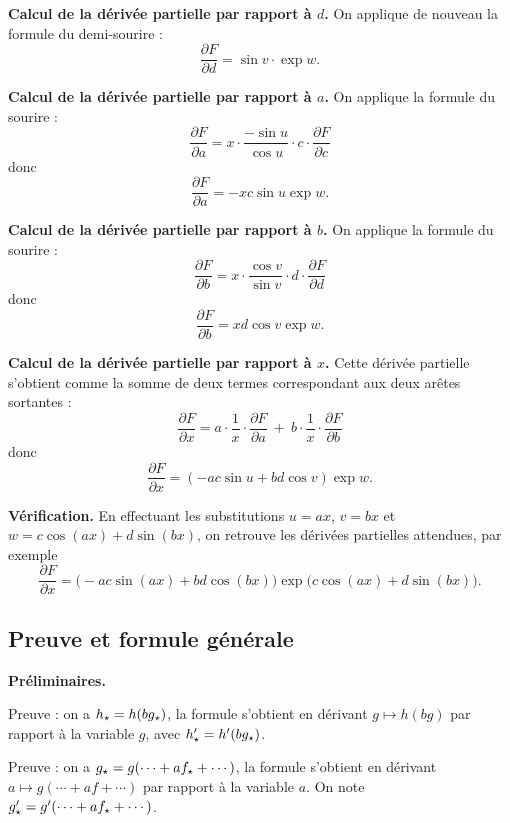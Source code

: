{\textbf{Calcul de la dérivée partielle par rapport à $d$.}
On applique de nouveau la formule du demi-sourire :
$$\frac{\partial F}{\partial d} = \sin v \cdot \exp w.$$

\textbf{Calcul de la dérivée partielle par rapport à $a$.}
On applique la formule du sourire :
$$\frac{\partial F}{\partial a} = x \cdot \frac{-\sin u}{\cos u} \cdot c \cdot  \frac{\partial F}{\partial c}$$
donc 
$$\frac{\partial F}{\partial a} = -x c \sin u \exp w.$$

\textbf{Calcul de la dérivée partielle par rapport à $b$.}
On applique la formule du sourire :
$$\frac{\partial F}{\partial b} = x \cdot \frac{\cos v}{\sin v} \cdot d \cdot  \frac{\partial F}{\partial d}$$
donc 
$$\frac{\partial F}{\partial b} = x d \cos v \exp w.$$

\textbf{Calcul de la dérivée partielle par rapport à $x$.}
Cette dérivée partielle s'obtient comme la somme de deux termes correspondant aux deux arêtes sortantes :
$$\frac{\partial F}{\partial x} = a \cdot \frac{1}{x} \cdot \frac{\partial F}{\partial a} \ + \  b \cdot \frac{1}{x} \cdot \frac{\partial F}{\partial b}$$
donc 
$$\frac{\partial F}{\partial x} = (-ac\sin u + bd\cos v) \exp w.$$

\textbf{Vérification.}
En effectuant les substitutions $u=ax$, $v=bx$ et $w =c\cos (ax) + d\sin (bx)$,
on retrouve les dérivées partielles attendues, par exemple
$$\frac{\partial F}{\partial x} = \big(-ac\sin (ax) + bd\cos (bx) \big) \exp \big(c\cos (ax) + d\sin (bx) \big).$$

\subsection{Preuve et formule générale}


\textbf{Préliminaires.}

Preuve : on a $h_\star = h(b g_\star)$, la formule s'obtient en dérivant $g \mapsto h(bg)$ par rapport à la variable $g$, avec 
$h'_\star = h'(b g_\star)$.

Preuve : on a $g_\star = g(\cdots + a f_\star+\cdots)$, la formule s'obtient en dérivant $a \mapsto g(\cdots + a f +\cdots)$ par rapport à la variable $a$. On note $g'_\star = g'(\cdots + a f_\star+\cdots)$.

}
